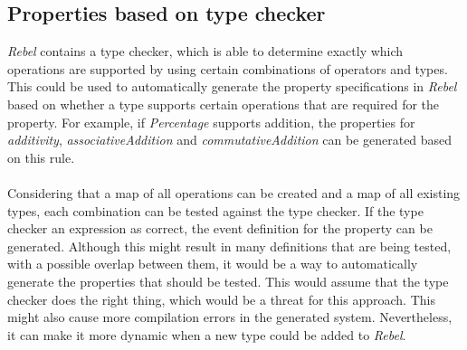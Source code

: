 \subsection*{Properties based on type checker}
\textit{Rebel} contains a type checker, which is able to determine exactly
which operations are supported by using certain combinations of operators and
types. This could be used to automatically generate the property specifications
in \textit{Rebel} based on whether a type supports certain operations that are
required for the property. For example, if \textit{Percentage} supports
addition, the properties for \textit{additivity}, \textit{associativeAddition}
and \textit{commutativeAddition} can be generated based on this rule.\\
\\
Considering that a map
of all operations can be created and a map of all existing types, each
combination can be tested against the type checker. If the type checker an
expression as correct, the event definition for the property can
be generated. Although this might result in many definitions that are being
tested, with a possible overlap between them, it would be a way to automatically
generate the properties that should be tested. This would assume that the type
checker does the right thing, which would be a threat for this approach. This
might also cause more compilation errors in the generated system. Nevertheless,
it can make it more dynamic when a new type could be added to \textit{Rebel}.
